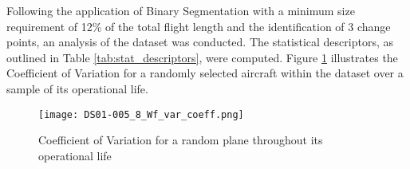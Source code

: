 \documentclass{IEEEtran}
\begin{document}
        Following the application of Binary Segmentation with a minimum size requirement of 12\% of the total flight length and the identification of 3 change points, an analysis of the dataset was conducted. The statistical descriptors, as outlined in Table \ref{tab:stat_descriptors}, were computed. Figure \ref{fig:var_coeff_sample} illustrates the Coefficient of Variation for a randomly selected aircraft within the dataset over a sample of its operational life.
        \begin{figure}[!htbp]
            \centering
            \texttt{[image: DS01-005\_8\_Wf\_var\_coeff.png]}
            \caption{Coefficient of Variation for a random plane throughout its operational life}
            \label{fig:var_coeff_sample}
        \end{figure}
\end{document}
